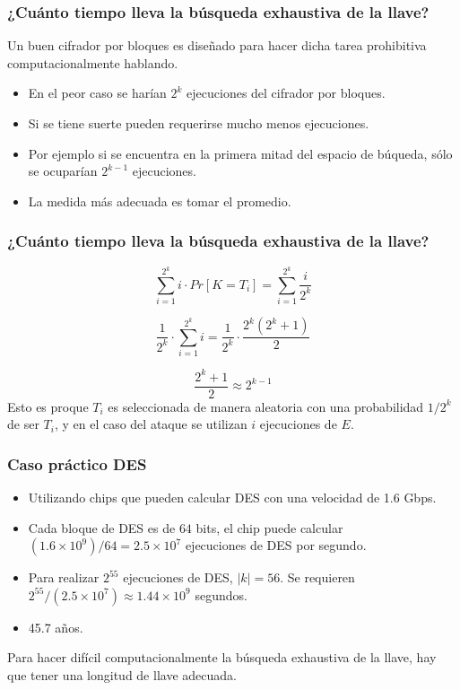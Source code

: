 \documentclass{beamer}
\begin{document}
\frame
{
	\frametitle{¿Cuánto tiempo lleva la búsqueda exhaustiva de la llave?}

{\color{blue}Un buen cifrador por bloques es diseñado para hacer dicha tarea prohibitiva computacionalmente hablando.}

\begin{itemize}
\item En el peor caso se harían $2^k$ ejecuciones del cifrador por bloques.
\item Si se tiene suerte pueden requerirse mucho menos ejecuciones.
\item Por ejemplo si se encuentra en la primera mitad del espacio de búqueda, sólo se ocuparían $2^{k-1}$ ejecuciones.
\item La medida más adecuada es tomar el promedio.
\end{itemize}

}


\frame
{
	\frametitle{¿Cuánto tiempo lleva la búsqueda exhaustiva de la llave?}

	$$\sum_{i=1}^{2^k} i \cdot Pr\left[ K=T_i \right]= \sum_{i=1}^{2^k} \frac{i}{2^k}$$
	
	$$\frac{1}{2^k} \cdot \sum_{i=1}^{2^k}i=\frac{1}{2^k}\cdot \frac{2^k(2^k+1)}{2}$$	
	
	$$\frac{2^k+1}{2} \approx 2^{k-1} $$
	\pause
	{\color{red}Esto es proque $T_i$ es seleccionada de manera aleatoria con una probabilidad $1/2^k$ de ser $T_i$, y en el caso del ataque se utilizan $i$ ejecuciones de $E$.}
	
}

\frame
{
	\frametitle{Caso práctico DES}

	\begin{itemize}
	\item Utilizando chips que pueden calcular DES con una velocidad de 1.6 Gbps.
	\item Cada bloque de DES es de $64$ bits, el chip puede calcular $(1.6\times 10^9)/64=2.5\times 10^{7}$ ejecuciones de DES por segundo.
	\item Para realizar $2^{55}$ ejecuciones de DES, $|k|=56$. Se requieren $2^{55}/(2.5\times 10^7)\approx 1.44\times 10^9$ segundos.\pause
	\item 45.7 años.
	\end{itemize}
	
	{\color{purple} Para hacer difícil computacionalmente la búsqueda exhaustiva de la llave, hay que tener una longitud de llave adecuada.}

}
\end{document}
